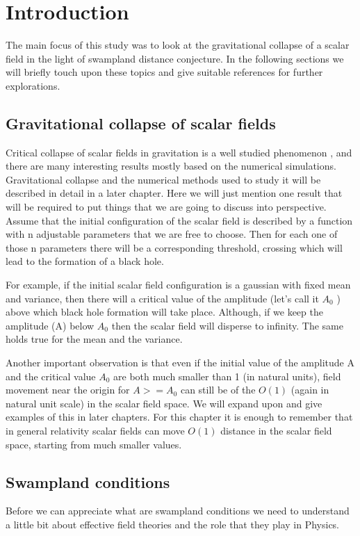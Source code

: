 \chapter{Introduction}

The main focus of this study was to look at the gravitational collapse of a scalar field in the light of swampland distance conjecture. In the following sections we will briefly touch upon these topics and give suitable references for further explorations.

\section{Gravitational collapse of scalar fields}


Critical collapse of scalar fields in gravitation is a well studied phenomenon \citep{Gundlach:2007gc}, and there are many interesting results mostly based on the numerical simulations.
Gravitational collapse and the numerical methods used to study it will be described in detail in a later chapter. Here we will just mention one result that will be required to put things that we are going to discuss into perspective.
Assume that the initial configuration of the scalar field is described by a function with n adjustable parameters that we are free to choose. Then for each one of those n parameters there will be a corresponding threshold, crossing which will lead to the formation of a black hole.

For example, if the initial scalar field configuration is a gaussian with fixed mean and variance, then there will a critical value of the amplitude (let’s call it $A_0$ ) above which black hole formation will take place. Although, if we keep the amplitude (A) below $A_0$ then the scalar field will disperse to infinity. The same holds true for the
mean and the variance.

Another important observation is that even if the initial value of the amplitude A and the critical value $A_0$ are both much smaller than 1 (in natural units), field movement near the origin for $A >= A_0$ can still be of the $O(1)$ (again in natural unit scale) in the scalar field space. We will expand upon and give examples of this in later chapters.
For this chapter it is enough to remember that in general relativity scalar fields can move $O(1)$ distance in the scalar field space, starting from much smaller values.

\section{Swampland conditions}
Before we can appreciate what are swampland conditions we need to understand a little bit about effective field theories and the role that they play in Physics.

